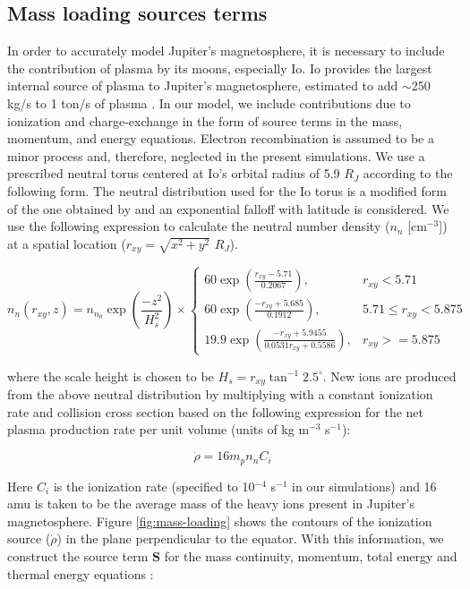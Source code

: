 \subsection{Mass loading sources terms}
In order to accurately model Jupiter's magnetosphere, it is necessary to include the contribution of plasma by its moons, especially Io. Io provides the largest internal source of plasma to Jupiter's magnetosphere, estimated to add $\sim$250 kg/s to 1 ton/s of plasma \cite{Bagenal2011b}. In our model, we include contributions due to ionization and charge‐exchange in the form of source terms in the mass, momentum, and energy equations. Electron recombination is assumed to be a minor process and, therefore, neglected in the present simulations. We use a prescribed neutral torus centered at Io's orbital radius of 5.9 $R_J$ according to the following form. The neutral distribution used for the Io torus is a modified form of the one obtained by  and an exponential falloff with latitude is considered. We use the following expression to calculate the neutral number density ($n_n$ [cm$^{-3}$]) at a spatial location ($r_{xy} = \sqrt{x^2 + y^2}$ $R_J$). 

\begin{equation}
    n_n \left(r_{xy}, z\right) = n_{n_0} \exp{\left(\frac{-z^2}{H_s^2}\right)}\times 
    \begin{cases}
        60 \exp\left( \frac{r_{xy} - 5.71}{0.2067}\right), & r_{xy} < 5.71\\
        60 \exp\left( \frac{-r_{xy} + 5.685}{0.1912}\right), &
        5.71 \leq r_{xy} < 5.875\\
        19.9 \exp\left( \frac{-r_{xy} + 5.9455}{0.0531 r_{xy} + 0.5586 }\right), &r_{xy} >= 5.875
    \end{cases}
\end{equation}

where the scale height is chosen to be $H_s = r_{xy} \tan^{-1}2.5^\circ$. New ions are produced from the above neutral distribution by multiplying with a constant ionization rate and collision cross section based on the following expression for the net plasma production rate per unit volume (units of kg m$^{-3}$ s$^{-1}$):

\begin{equation}
    \dot{\rho} = 16 m_p n_n C_i
\end{equation}

Here $C_i$ is the ionization rate (specified to 10$^{-4}$ s$^{-1}$ in our simulations) and 16 amu is taken to be the average mass of the heavy ions present in Jupiter's magnetosphere. Figure \ref{fig:mass-loading} shows the contours of the ionization source ($\dot{\rho}$) in the plane perpendicular to the equator. With this information, we construct the source term $\mathbf{S}$ for the mass continuity, momentum, total energy and thermal energy equations \cite{Hansen2001a, Gombosi1996Three-dimensionalEnvironments}: 

